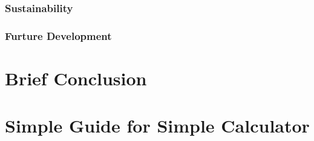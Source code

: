 \documentclass[12pt,a4paper]{article}
\begin{document}
\subsubsection{Sustainability}
\textnormal{}

\subsubsection{Furture Development}
\textnormal{}

\section{Brief Conclusion}
\textnormal{}
\iffalse
• Avslutning: Sammanfattning, diskussion, slutsatser
\fi

\section{Simple Guide for Simple Calculator}
\textnormal{}
\iffalse
• Användarhandledning med exempel (use cases)
\fi

\end{document}
